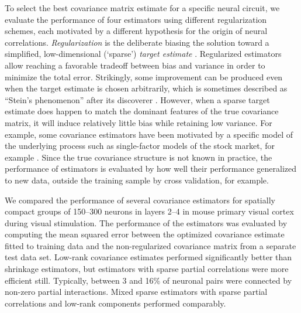To select the best covariance matrix estimate for a specific neural circuit, we evaluate the performance of four estimators using different regularization schemes, each motivated by  a different hypothesis for the origin of neural correlations. \emph{Regularization} is the deliberate biasing the solution toward a simplified, low-dimensional (`sparse') \emph{target estimate} \cite{Schafer:2005,Bickel:2006}.
Regularized estimators allow reaching a favorable tradeoff between bias and variance in order to minimize the total error.
Strikingly, some improvement can be produced even when the target estimate is chosen arbitrarily, which is sometimes described as ``Stein's phenomenon'' after its discoverer \cite{Stein:1956}.   However, when a sparse target estimate does happen to match the dominant features of the true covariance matrix, it will induce relatively little bias while retaining low variance.  For example, some covariance estimators have been motivated by a specific model of the underlying process such as single-factor models of the stock market, for example \cite{Ledoit:2003}. 
Since the true covariance structure is not known in practice, the performance of estimators is evaluated by how well their performance generalized to new data, outside the training sample by cross validation, for example. 


We compared the performance of several covariance estimators for spatially compact groups of 150--300 neurons in layers 2--4 in mouse primary visual cortex during visual stimulation.   The performance of the estimators was evaluated by computing the mean squared error between the optimized covariance estimate fitted to training data and the non-regularized covariance matrix from a separate test data set.  Low-rank covariance estimates performed significantly better than shrinkage estimators, but estimators with sparse partial correlations were more efficient still. Typically, between 3 and 16\% of neuronal pairs were connected by non-zero partial interactions.  Mixed sparse estimators with sparse partial correlations and low-rank components performed comparably. 


